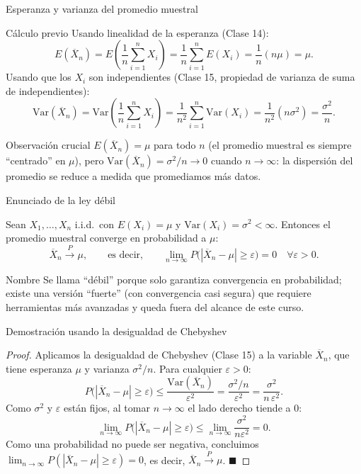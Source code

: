\documentclass[aspectratio=169,11pt]{beamer}
\begin{document}
\begin{frame}{Esperanza y varianza del promedio muestral}
\begin{block}{Cálculo previo}
Usando linealidad de la esperanza (Clase 14):
\[
E(\overline{X}_n) = E\left(\frac{1}{n}\sum_{i=1}^n X_i\right) = \frac{1}{n}\sum_{i=1}^n E(X_i) = \frac{1}{n}(n\mu) = \mu.
\]
Usando que los $X_i$ son independientes (Clase 15, propiedad de varianza de suma de independientes):
\[
\text{Var}(\overline{X}_n) = \text{Var}\left(\frac{1}{n}\sum_{i=1}^n X_i\right) = \frac{1}{n^2}\sum_{i=1}^n \text{Var}(X_i) = \frac{1}{n^2}(n\sigma^2) = \frac{\sigma^2}{n}.
\]
\end{block}

\begin{alertblock}{Observación crucial}
$E(\overline{X}_n) = \mu$ para todo $n$ (el promedio muestral es siempre ``centrado'' en $\mu$), pero $\text{Var}(\overline{X}_n) = \sigma^2/n \to 0$ cuando $n\to\infty$: la dispersión del promedio se reduce a medida que promediamos más datos.
\end{alertblock}
\end{frame}

\begin{frame}{Enunciado de la ley débil}
\begin{theorem}
Sean $X_1,\dots,X_n$ i.i.d.\ con $E(X_i)=\mu$ y $\text{Var}(X_i)=\sigma^2<\infty$. Entonces el promedio muestral converge en probabilidad a $\mu$:
\[
\overline{X}_n \xrightarrow{P} \mu, \qquad \text{es decir,} \qquad \lim_{n\to\infty} P\big(|\overline{X}_n - \mu| \geq \varepsilon\big) = 0 \quad \forall \varepsilon>0.
\]
\end{theorem}

\begin{block}{Nombre}
Se llama ``débil'' porque solo garantiza convergencia en probabilidad; existe una versión ``fuerte'' (con convergencia casi segura) que requiere herramientas más avanzadas y queda fuera del alcance de este curso.
\end{block}
\end{frame}

\begin{frame}{Demostración usando la desigualdad de Chebyshev}
\begin{proof}
Aplicamos la desigualdad de Chebyshev (Clase 15) a la variable $\overline{X}_n$, que tiene esperanza $\mu$ y varianza $\sigma^2/n$. Para cualquier $\varepsilon>0$:
\[
P\big(|\overline{X}_n - \mu| \geq \varepsilon\big) \leq \frac{\text{Var}(\overline{X}_n)}{\varepsilon^2} = \frac{\sigma^2/n}{\varepsilon^2} = \frac{\sigma^2}{n\,\varepsilon^2}.
\]
Como $\sigma^2$ y $\varepsilon$ están fijos, al tomar $n\to\infty$ el lado derecho tiende a $0$:
\[
\lim_{n\to\infty} P\big(|\overline{X}_n-\mu|\geq\varepsilon\big) \leq \lim_{n\to\infty} \frac{\sigma^2}{n\varepsilon^2} = 0.
\]
Como una probabilidad no puede ser negativa, concluimos $\lim_{n\to\infty}P(|\overline{X}_n-\mu|\geq\varepsilon)=0$, es decir, $\overline{X}_n \xrightarrow{P} \mu$. $\blacksquare$
\end{proof}
\end{frame}
\end{document}
